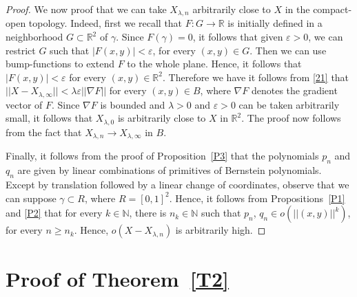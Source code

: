 \documentclass[11pt]{amsart}
\begin{document}
\begin{proof}
We now proof that we can take $X_{\lambda,n}$ arbitrarily close to $X$ in the compact-open topology. Indeed, first we recall that $F\colon G\to\mathbb{R}$ is initially defined in a neighborhood $G\subset\mathbb{R}^2$ of $\gamma$. Since $F(\gamma)=0$, it follows that given $\varepsilon>0$, we can restrict $G$ such that $|F(x,y)|<\varepsilon$, for every $(x,y)\in G$. Then we can use bump-functions to extend $F$ to the whole plane. Hence, it follows that $|F(x,y)|<\varepsilon$ for every $(x,y)\in\mathbb{R}^2$. Therefore we have it follows from \eqref{21} that $||X-X_{\lambda,\infty}||<\lambda\varepsilon||\nabla F||$
for every $(x,y)\in B$, where $\nabla F$ denotes the gradient vector of $F$. Since $\nabla F$ is bounded and $\lambda>0$ and $\varepsilon>0$ can be taken arbitrarily small, it follows that $X_{\lambda,0}$ is arbitrarily close to $X$ in $\mathbb{R}^2$. The proof now follows from the fact that $X_{\lambda,n}\to X_{\lambda,\infty}$ in $B$. 

Finally, it follows from the proof of Proposition~\ref{P3} that the polynomials $p_n$ and $q_n$ are given by linear combinations of primitives of Bernstein polynomials. Except by translation followed by a linear change of coordinates, observe that we can suppose $\gamma\subset R$, where $R=[0,1]^2$. Hence, it follows from Propositions~\ref{P1} and \ref{P2} that for every $k\in\mathbb{N}$, there is $n_k\in\mathbb{N}$ such that $p_n$, $q_n\in o(||(x,y)||^k)$, for every $n\geqslant n_k$. Hence, $o(X-X_{\lambda,n})$ is arbitrarily high. \end{proof}

\section{Proof of Theorem~\ref{T2}}\label{Sec5}
\end{document}
